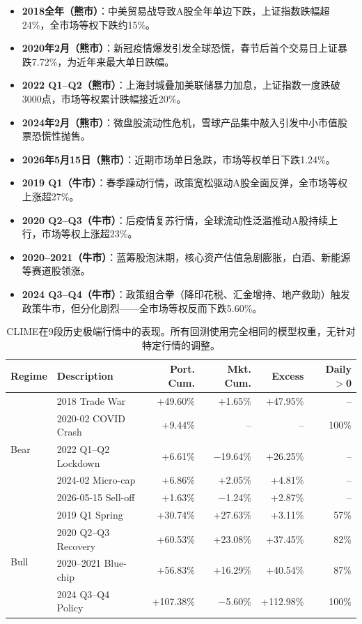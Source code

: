 \begin{itemize}[leftmargin=*, itemsep=3pt]
    \item \textbf{2018全年（熊市）}：中美贸易战导致A股全年单边下跌，上证指数跌幅超24\%，全市场等权下跌约15\%。
    \item \textbf{2020年2月（熊市）}：新冠疫情爆发引发全球恐慌，春节后首个交易日上证暴跌7.72\%，为近年来最大单日跌幅。
    \item \textbf{2022 Q1--Q2（熊市）}：上海封城叠加美联储暴力加息，上证指数一度跌破3000点，市场等权累计跌幅接近20\%。
    \item \textbf{2024年2月（熊市）}：微盘股流动性危机，雪球产品集中敲入引发中小市值股票恐慌性抛售。
    \item \textbf{2026年5月15日（熊市）}：近期市场单日急跌，市场等权单日下跌1.24\%。
    \item \textbf{2019 Q1（牛市）}：春季躁动行情，政策宽松驱动A股全面反弹，全市场等权上涨超27\%。
    \item \textbf{2020 Q2--Q3（牛市）}：后疫情复苏行情，全球流动性泛滥推动A股持续上行，市场等权上涨超23\%。
    \item \textbf{2020--2021（牛市）}：蓝筹股泡沫期，核心资产估值急剧膨胀，白酒、新能源等赛道股领涨。
    \item \textbf{2024 Q3--Q4（牛市）}：政策组合拳（降印花税、汇金增持、地产救助）触发政策牛市，但分化剧烈——全市场等权反而下跌5.60\%。
\end{itemize}

\begin{table}[H]
\centering
\caption{CLIME在9段历史极端行情中的表现。所有回测使用完全相同的模型权重，无针对特定行情的调整。}
\label{tab:rq1_stress}
\begin{tabular}{@{}llrrrr@{}}
\toprule
Regime & Description & Port. Cum. & Mkt. Cum. & Excess & Daily $>$0 \\
\midrule
\multirow{5}{*}{Bear} & 2018 Trade War      & +49.60\% & +1.65\%  & +47.95\% & -- \\
                       & 2020-02 COVID Crash  & +9.44\%  & --       & --       & 100\% \\
                       & 2022 Q1--Q2 Lockdown & +6.61\%  & $-$19.64\% & +26.25\% & -- \\
                       & 2024-02 Micro-cap    & +6.86\%  & +2.05\%  & +4.81\%  & -- \\
                       & 2026-05-15 Sell-off & +1.63\%  & $-$1.24\% & +2.87\%  & -- \\
\midrule
\multirow{4}{*}{Bull} & 2019 Q1 Spring       & +30.74\% & +27.63\% & +3.11\%  & 57\% \\
                       & 2020 Q2--Q3 Recovery & +60.53\% & +23.08\% & +37.45\% & 82\% \\
                       & 2020--2021 Blue-chip & +56.83\% & +16.29\% & +40.54\% & 87\% \\
                       & 2024 Q3--Q4 Policy   & +107.38\% & $-$5.60\% & +112.98\% & 100\% \\
\bottomrule
\end{tabular}
\end{table}

